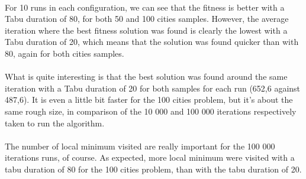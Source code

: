 \documentclass[12pt,oneside,a4paper]{article}
\begin{document}
  \begin{table}[h]
    \caption{Average of the parameters for the four configurations}
  \end{table}
  \paragraph{}
  For 10 runs in each configuration, we can see that the fitness is better 
  with a Tabu duration of 80, for both 50 and 100 cities samples. However, 
  the average iteration where the best fitness solution was found is clearly the 
  lowest with a Tabu duration of 20, which means that the solution was found quicker 
  than with 80, again for both cities samples. 
  \paragraph{}What is quite interesting is that the best solution 
  was found around the same iteration with a Tabu duration of 20 for both samples for each run (652,6 against 487,6). 
  It is even a little bit faster for the 100 cities problem, but it's about the same rough size, in comparison of the 10 000 and 100 000 iterations respectively
   taken to run the algorithm.
\paragraph{}The number of local minimum visited are really important for the 100 000 iterations runs, 
of course. As expected, more local minimum were visited with a tabu duration of 80 for
the 100 cities problem, than with the tabu duration of 20.
\end{document}
